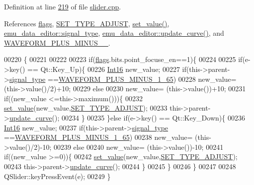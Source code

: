 Definition at line \hyperlink{a00046_source_l00219}{219} of file \hyperlink{a00046_source}{slider.\+cpp}.



References \hyperlink{a00024_ade6449558d429b66e5ed1381bc9b9060}{flags}, \hyperlink{a00034_source_l00049}{S\+E\+T\+\_\+\+T\+Y\+P\+E\+\_\+\+A\+D\+J\+U\+S\+T}, \hyperlink{a00046_source_l00102}{set\+\_\+value()}, \hyperlink{a00036_source_l00039}{emu\+\_\+data\+\_\+editor\+::signal\+\_\+type}, \hyperlink{a00035_source_l00284}{emu\+\_\+data\+\_\+editor\+::update\+\_\+curve()}, and \hyperlink{a00034_source_l00040}{W\+A\+V\+E\+F\+O\+R\+M\+\_\+\+P\+L\+U\+S\+\_\+\+M\+I\+N\+U\+S\+\_\+\_}.


\begin{DoxyCode}
00220 \{
00221 
00222 
00223     \textcolor{keywordflow}{if}(\hyperlink{a00024_ade6449558d429b66e5ed1381bc9b9060}{flags}.bits.point\_focuse\_en==1)\{
00224 
00225     \textcolor{keywordflow}{if}(e->key() == Qt::Key\_Up)\{
00226         \hyperlink{a00001_a3985266aecb120f269789241c170850c}{Int16} new\_value;
00227         \textcolor{keywordflow}{if}(this->parent->\hyperlink{a00004_a070edaec5aee6ba1f5a6866bc32c8ce4}{signal\_type} ==\hyperlink{a00034_a0923d3b365a36e1e8c401cec964aa36f}{WAVEFORM\_PLUS\_MINUS\_1\_65})
00228         new\_value= (this->value()/2)+10;
00229         \textcolor{keywordflow}{else}
00230         new\_value= (this->value())+10;
00231         \textcolor{keywordflow}{if}((new\_value <=this->maximum()))\{
00232             \hyperlink{a00024_ae3010d3de02715db2f443560d7d2a27b}{set\_value}(new\_value,\hyperlink{a00034_a16b6b7b5ad68ec0dd62a3c9e97f88adb}{SET\_TYPE\_ADJUST});
00233             this->parent->\hyperlink{a00004_a15cbcf5f0a17281468800f47898f60c1}{update\_curve}();
00234         \}
00235     \}\textcolor{keywordflow}{else} \textcolor{keywordflow}{if}(e->key() == Qt::Key\_Down)\{
00236         \hyperlink{a00001_a3985266aecb120f269789241c170850c}{Int16} new\_value;
00237         \textcolor{keywordflow}{if}(this->parent->\hyperlink{a00004_a070edaec5aee6ba1f5a6866bc32c8ce4}{signal\_type} ==\hyperlink{a00034_a0923d3b365a36e1e8c401cec964aa36f}{WAVEFORM\_PLUS\_MINUS\_1\_65})
00238         new\_value= (this->value()/2)-10;
00239         \textcolor{keywordflow}{else}
00240         new\_value= (this->value())-10;
00241         \textcolor{keywordflow}{if}((new\_value >=0))\{
00242             \hyperlink{a00024_ae3010d3de02715db2f443560d7d2a27b}{set\_value}(new\_value,\hyperlink{a00034_a16b6b7b5ad68ec0dd62a3c9e97f88adb}{SET\_TYPE\_ADJUST});
00243             this->parent->\hyperlink{a00004_a15cbcf5f0a17281468800f47898f60c1}{update\_curve}();
00244         \}
00245     \}
00246     \}
00247 
00248     QSlider::keyPressEvent(e);
00249 \}
\end{DoxyCode}


